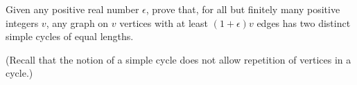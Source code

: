 Given  any  positive  real  number $\epsilon$,  prove  that,  for  all  but  finitely  many  positive integers $v$, any graph on $v$ vertices with at least $(1+\epsilon)v$ edges has two distinct simple cycles of equal lengths.

(Recall that the notion of a simple cycle does not allow repetition of vertices in a cycle.)